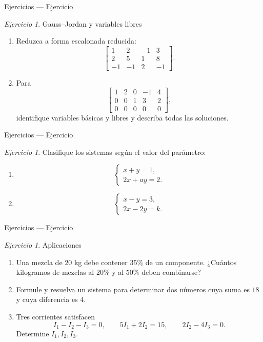 \documentclass[aspectratio=169,11pt]{beamer}
\theoremstyle{remark}
\newtheorem{Ejer}[definicion]{Ejercicio}
\begin{document}
\begin{frame}[shrink=5]{Ejercicios — Ejercicio}
\footnotesize
\begin{Ejer}  Gauss--Jordan y variables libres
\begin{enumerate}

\item Reduzca a forma escalonada reducida:
\[
\left[
\begin{array}{ccc|c}
1&2&-1&3\\
2&5&1&8\\
-1&-1&2&-1
\end{array}
\right].
\]
\item Para
\[
\left[
\begin{array}{cccc|c}
1&2&0&-1&4\\
0&0&1&3&2\\
0&0&0&0&0
\end{array}
\right],
\]
identifique variables básicas y libres y describa todas las soluciones.
\end{enumerate}
\end{Ejer}
\end{frame}

\begin{frame}[shrink=5]{Ejercicios — Ejercicio}
\footnotesize
\begin{Ejer} 
Clasifique los sistemas según el valor del parámetro:
\begin{enumerate}

\item
\[
\begin{cases}
x+y=1,\\
2x+ay=2.
\end{cases}
\]
\item
\[
\begin{cases}
x-y=3,\\
2x-2y=k.
\end{cases}
\]
\end{enumerate}
\end{Ejer}
\end{frame}

\begin{frame}[shrink=5]{Ejercicios — Ejercicio}
\footnotesize
\begin{Ejer} Aplicaciones
\begin{enumerate}
\item Una mezcla de $20$ kg debe contener $35\%$ de un componente. ¿Cuántos kilogramos de mezclas
al $20\%$ y al $50\%$ deben combinarse?
\item Formule y resuelva un sistema para determinar dos números cuya suma es $18$ y cuya diferencia
es $4$.
\item Tres corrientes satisfacen
\[
I_1-I_2-I_3=0,\qquad 5I_1+2I_2=15,\qquad 2I_2-4I_3=0.
\]
Determine $I_1,I_2,I_3$.
\end{enumerate}
\end{Ejer}
\end{frame}
\end{document}
